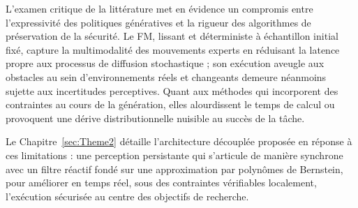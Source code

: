 \vspace{1em}
L'examen critique de la littérature met en évidence un compromis entre l'expressivité des politiques génératives et la rigueur des algorithmes de préservation de la sécurité. Le \ac{FM}, lissant et déterministe à échantillon initial fixé, capture la multimodalité des mouvements experts en réduisant la latence propre aux processus de diffusion stochastique ; son exécution aveugle aux obstacles au sein d'environnements réels et changeants demeure néanmoins sujette aux incertitudes perceptives. Quant aux méthodes qui incorporent des contraintes au cours de la génération, elles alourdissent le temps de calcul ou provoquent une dérive distributionnelle nuisible au succès de la tâche.

Le Chapitre~\ref{sec:Theme2} détaille l'architecture découplée proposée en réponse à ces limitations : une perception persistante qui s'articule de manière synchrone avec un filtre réactif fondé sur une approximation par polynômes de Bernstein, pour améliorer en temps réel, sous des contraintes vérifiables localement, l'exécution sécurisée au centre des objectifs de recherche.
